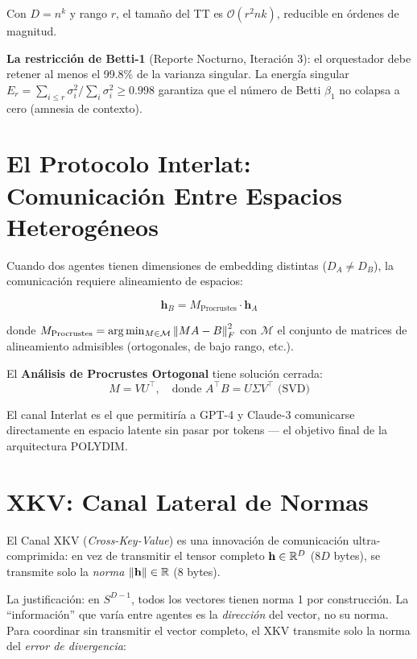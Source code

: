 Con $D = n^k$ y rango $r$, el tamaño del TT es $\mathcal{O}(r^2 n k)$, reducible en órdenes de magnitud.

\textbf{La restricción de Betti-1} (Reporte Nocturno, Iteración 3): el orquestador
debe retener al menos el 99.8\% de la varianza singular. La energía singular
$E_r = \sum_{i \le r} \sigma_i^2 / \sum_{i} \sigma_i^2 \ge 0.998$ garantiza que
el número de Betti $\beta_1$ no colapsa a cero (amnesia de contexto).

\section{El Protocolo Interlat: Comunicación Entre Espacios Heterogéneos}

Cuando dos agentes tienen dimensiones de embedding distintas ($D_A \ne D_B$), la
comunicación requiere alineamiento de espacios:

\begin{equation}
\mathbf{h}_B = M_{\text{Procrustes}} \cdot \mathbf{h}_A
\end{equation}

donde $M_{\text{Procrustes}} = \arg\min_{M \in \mathcal{M}} \norm{M A - B}_F^2$
con $\mathcal{M}$ el conjunto de matrices de alineamiento admisibles (ortogonales,
de bajo rango, etc.).

El \textbf{Análisis de Procrustes Ortogonal} tiene solución cerrada:
\begin{equation}
M = V U^\top, \quad \text{donde } A^\top B = U \Sigma V^\top \text{ (SVD)}
\end{equation}

El canal Interlat es el que permitiría a GPT-4 y Claude-3 comunicarse directamente
en espacio latente sin pasar por tokens --- el objetivo final de la arquitectura POLYDIM.

\section{XKV: Canal Lateral de Normas}

El Canal XKV (\textit{Cross-Key-Value}) es una innovación de comunicación ultra-comprimida:
en vez de transmitir el tensor completo $\mathbf{h} \in \mathbb{R}^D$ ($8D$ bytes), se transmite
solo la \textit{norma} $\norm{\mathbf{h}} \in \mathbb{R}$ (8 bytes).

La justificación: en $S^{D-1}$, todos los vectores tienen norma 1 por construcción.
La ``información'' que varía entre agentes es la \textit{dirección} del vector, no su norma.
Para coordinar sin transmitir el vector completo, el XKV transmite solo la norma del
\textit{error de divergencia}:

